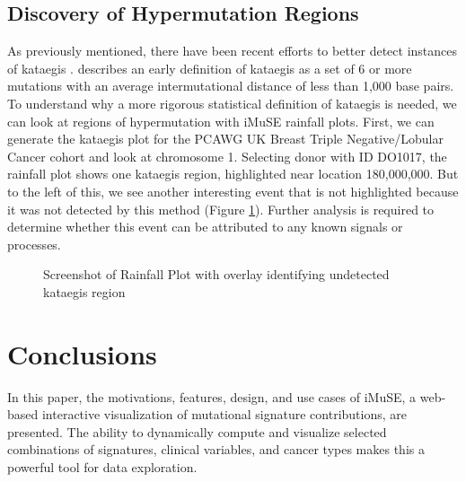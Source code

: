 \documentclass[12pt, letterpaper]{article}
\begin{document}
\subsection{Discovery of Hypermutation Regions}
As previously mentioned, there have been recent efforts to better detect instances of kataegis \citep{yousif2018origins}.
\citet{alexandrov2013signatures} describes an early definition of kataegis as a set of 6 or more mutations with an average intermutational distance of less than 1,000 base pairs.
To understand why a more rigorous statistical definition of kataegis is needed, we can look at regions of hypermutation with iMuSE rainfall plots.
First, we can generate the kataegis plot for the PCAWG UK Breast Triple Negative/Lobular Cancer cohort and look at chromosome 1.
Selecting donor with ID DO1017, the rainfall plot shows one kataegis region, highlighted near location 180,000,000. 
But to the left of this, we see another interesting event that is not highlighted because it was not detected by this method (Figure \ref{fig:caseStudy3}).
Further analysis is required to determine whether this event can be attributed to any known signals or processes.
\begin{figure}[h]
    \centering
    \caption{Screenshot of Rainfall Plot with overlay identifying undetected kataegis region}
    \label{fig:caseStudy3}
\end{figure}


\section{Conclusions}
In this paper, the motivations, features, design, and use cases of iMuSE, a web-based interactive visualization of mutational signature contributions, are presented. 
The ability to dynamically compute and visualize selected combinations of signatures, clinical variables, and cancer types makes this a powerful tool for data exploration.
\end{document}
